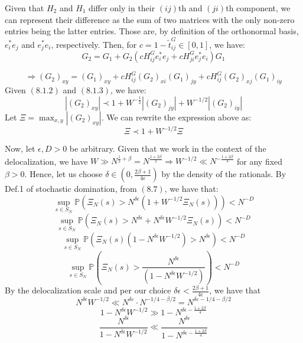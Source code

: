 \documentclass[11pt]{article}
\begin{document}
\noindent Given that $H_2$ and $H_1$ differ only in their $(ij)$th and $(ji)$th component, we can represent their difference as the sum of two matrices with the only non-zero entries being the latter entries. Those are, by definition of the orthonormal basis, $e_i^*e_j$ and $e_j^*e_i$, respectively. Then, for $c = 1-\tilde{t}_{ij}^G\in [0, 1]$, we have:
\begin{equation*}
G_2= G_1 + G_2\left(cH_{ij}^Ge_i^*e_j+ cH_{ji}^G e_j^*e_i\right)G_1
\end{equation*}

$$\Rightarrow (G_2)_{xy} = (G_1)_{xy} + cH_{ij}^G (G_2)_{xi}(G_1)_{jy}+{c}H_{ij}^G (G_2)_{xj}(G_1)_{iy}$$
Given $(8.1.2)$ and $(8.1.3)$, we have:
$$|(G_2)_{xy}|\prec 1 + W^{-\frac{1}{2}}|(G_2)_{jy}|+W^{-1/2}|(G_2)_{iy}|$$
Let $\Xi = \max_{x, y}|(G_2)_{xy}|$. We can rewrite the expression above as: 
\begin{equation*}\Xi \prec 1 + W^{-1/2}\Xi\tag{8.7}\end{equation*}

\noindent Now, let $\epsilon, D>0$ be arbitrary. Given that we work in the context of the delocalization, we have $W\gg N^{\frac{1}{2}+\beta} = N^{\frac{1+2\beta}{2}}\Rightarrow W^{-1/2}\ll N^{-\frac{1+2\beta}{4}}$ for any fixed $\beta>0$. Hence, let us choose $\delta \in \left(0, \frac{2\beta+1}{4\epsilon}\right)$ by the density of the rationals. By Def.1 of stochastic domination, from $(8.7)$, we have that: $$\sup_{s\in S_N}\mathbb{P}\left(\Xi_N(s)>N^{\delta\epsilon}(1+W^{-1/2}\Xi_N(s))\right)<N^{-D}$$
$$\sup_{s\in S_N}\mathbb{P}\left(\Xi_N(s)>N^{\delta\epsilon}+N^{\delta\epsilon} W^{-1/2}\Xi_N(s)\right)<N^{-D}$$
$$\sup_{s\in S_N}\mathbb{P}\left(\Xi_N(s)(1-N^{\delta\epsilon} W^{-1/2})>N^{\delta\epsilon}\right)<N^{-D}$$
$$\sup_{s\in S_N}\mathbb{P}\left(\Xi_N(s)>\frac{N^{\delta\epsilon}}{(1-N^{\delta\epsilon} W^{-1/2})}\right)<N^{-D}$$
By the delocalization scale and per our choice $\delta\epsilon <\frac{2\beta+1}{4\epsilon}$, we have that $$N^{\delta\epsilon}W^{-1/2} \ll N^{\delta\varepsilon} \cdot N^{-1/4-\beta/2} = N^{\delta\varepsilon-1/4-\beta/2}$$
$$1-N^{\delta\epsilon} W^{-1/2}\gg 1-N^{\delta\epsilon -\frac{1+2\beta}{4}}$$
$$\frac{N^{\delta\epsilon}}{1-N^{\delta\epsilon} W^{-1/2}}\ll \frac{N^{\delta\epsilon}}{1-N^{{\delta\epsilon}-\frac{1+2\beta}{4}}}$$
\end{document}
